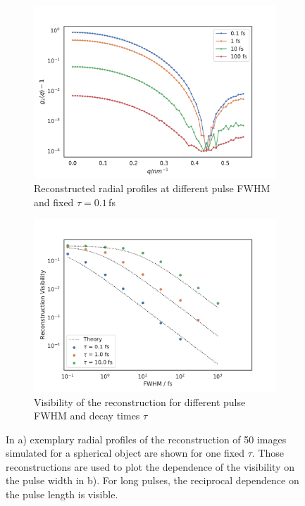 \begin{figure}
	\centering
	\begin{subfigure}[b]{0.45\textwidth}
		\centering
		\includegraphics[width=\linewidth]{images/tdsphere.pdf}
		\caption{Reconstructed radial profiles at different pulse FWHM and fixed $\tau = 0.1$\,fs}
	\end{subfigure}
	\hspace{0.1cm}
	\begin{subfigure}[b]{0.45\textwidth}
		\centering
		\includegraphics[width=\linewidth]{images/timedependent_2.pdf}
		\caption{Visibility of the reconstruction for different pulse FWHM and decay times $\tau$}
	\end{subfigure}

	\caption[Reconstruction Time Dependent IDI Simulation]{In a) exemplary radial profiles of the reconstruction of 50 images simulated for a spherical object are shown for one fixed $\tau$. Those reconstructions are used to plot the  dependence of the visibility on the pulse width in b). For long pulses, the reciprocal dependence on the pulse length is visible.}
	\label{fig:tdpshere}
\end{figure}




